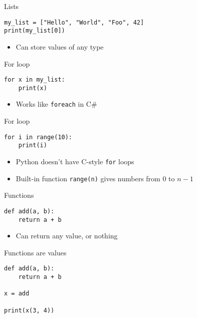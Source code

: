 \begin{frame}[fragile]{Lists}
    \begin{lstlisting}
my_list = ["Hello", "World", "Foo", 42]
print(my_list[0])
    \end{lstlisting}
    \begin{itemize}
        \pause\item Can store values of any type
    \end{itemize}
\end{frame}

\begin{frame}[fragile]{For loop}
    \begin{lstlisting}
for x in my_list:
    print(x)
    \end{lstlisting}
    \begin{itemize}
        \pause\item Works like \lstinline{foreach} in C\#
    \end{itemize}
\end{frame}

\begin{frame}[fragile]{For loop}
    \begin{lstlisting}
for i in range(10):
    print(i)
    \end{lstlisting}
    \begin{itemize}
        \pause\item Python doesn't have C-style \lstinline{for} loops
        \pause\item Built-in function \lstinline{range(n)} gives numbers from $0$ to $n-1$
    \end{itemize}
\end{frame}

\begin{frame}[fragile]{Functions}
    \begin{lstlisting}
def add(a, b):
    return a + b
    \end{lstlisting}
    \begin{itemize}
        \pause\item Can return any value, or nothing
    \end{itemize}
\end{frame}

\begin{frame}[fragile]{Functions are values}
    \begin{lstlisting}
def add(a, b):
    return a + b

x = add

print(x(3, 4))
    \end{lstlisting}
\end{frame}


